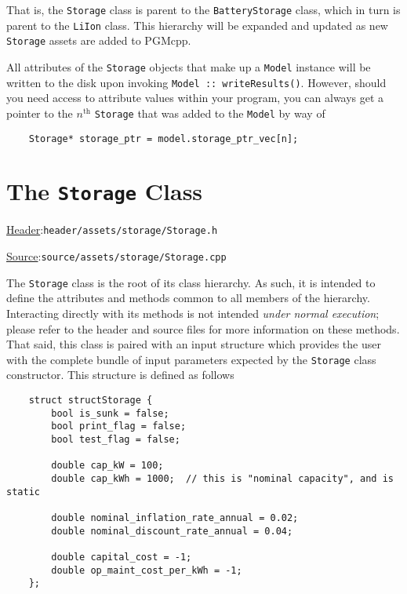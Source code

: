 \documentclass[12pt, letterpaper]{report}
\begin{document}
\noindent That is, the \texttt{Storage} class is parent to the \texttt{BatteryStorage} class, which in turn is parent to the \texttt{LiIon} class. This hierarchy will be expanded and updated as new \texttt{Storage} assets are added to PGMcpp.\par 
All attributes of the \texttt{Storage} objects that make up a \texttt{Model} instance will be written to the disk upon invoking \texttt{Model :: writeResults(\;\;)}. However, should you need access to attribute values within your program, you can always get a pointer to the $n^\textrm{th}$ \texttt{Storage} that was added to the \texttt{Model} by way of

\begin{verbatim}
    Storage* storage_ptr = model.storage_ptr_vec[n];
\end{verbatim}

\section{The \texttt{Storage} Class}

\begin{large}
\noindent\underline{Header}:\quad\texttt{header/assets/storage/Storage.h}\par
\noindent\underline{Source}:\quad\texttt{source/assets/storage/Storage.cpp}\par
\end{large}
\vspace{5mm}

The \texttt{Storage} class is the root of its class hierarchy. As such, it is intended to define the attributes and methods common to all members of the hierarchy. Interacting directly with its methods is not intended \textit{under normal execution}; please refer to the header and source files for more information on these methods. That said, this class is paired with an input structure which provides the user with the complete bundle of input parameters expected by the \texttt{Storage} class constructor. This structure is defined as follows

\begin{verbatim}
    struct structStorage {
        bool is_sunk = false;
        bool print_flag = false;
        bool test_flag = false;
        
        double cap_kW = 100;
        double cap_kWh = 1000;  // this is "nominal capacity", and is static
        
        double nominal_inflation_rate_annual = 0.02;
        double nominal_discount_rate_annual = 0.04;
        
        double capital_cost = -1;
        double op_maint_cost_per_kWh = -1;
    };
\end{verbatim}
\end{document}
